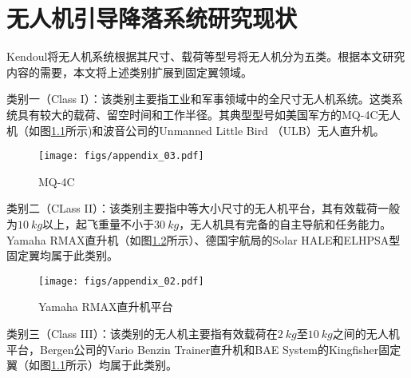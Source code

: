 \chapter{无人机引导降落系统研究现状}

 
Kendoul\cite{kendoul2012survey}将无人机系统根据其尺寸、载荷等型号将无人机分为五类。根据本文研究内容的需要，本文将上述类别扩展到固定翼领域。

类别一（Class I）：该类别主要指工业和军事领域中的全尺寸无人机系统。这类系统具有较大的载荷、留空时间和工作半径。其典型型号如美国军方的MQ-4C无人机（如图\ref{fig:appendix_03}所示)和波音公司的Unmanned Little Bird （ULB）无人直升机。
\begin{figure}[htb]   
	\centering
	\texttt{[image: figs/appendix\_03.pdf]}
	\caption{MQ-4C}
	\label{fig:appendix_03}
\end{figure}

类别二（CLass II）：该类别主要指中等大小尺寸的无人机平台，其有效载荷一般为$10\ kg$以上，起飞重量不小于$30\ kg$，无人机具有完备的自主导航和任务能力。Yamaha RMAX直升机（如图\ref{fig:appendix_02}所示）、德国宇航局的Solar HALE和ELHPSA型固定翼均属于此类别。
\begin{figure}[htb]   
	\centering
	\texttt{[image: figs/appendix\_02.pdf]}
	\caption{Yamaha RMAX直升机平台}
	\label{fig:appendix_02}
\end{figure}

类别三（Class III）：该类别的无人机主要指有效载荷在$2\ kg$至$10\ kg$之间的无人机平台，Bergen公司的Vario Benzin Trainer直升机和BAE System的Kingfisher固定翼（如图\ref{fig:appendix_03}所示）均属于此类别。

